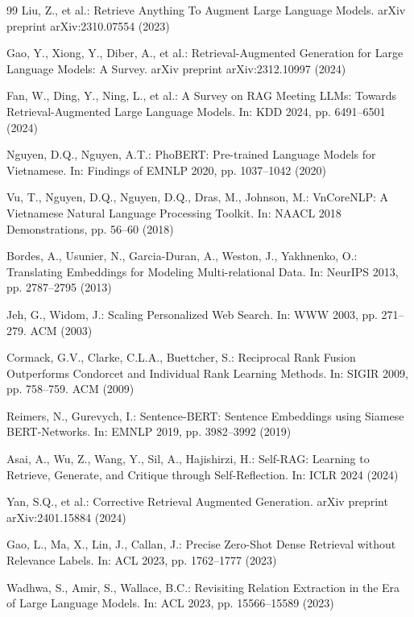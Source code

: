 \documentclass[11pt,a4paper]{article}
\begin{document}
\begin{thebibliography}{99}
Liu, Z., et al.: Retrieve Anything To Augment Large Language Models. arXiv preprint arXiv:2310.07554 (2023)

Gao, Y., Xiong, Y., Diber, A., et al.: Retrieval-Augmented Generation for Large Language Models: A Survey. arXiv preprint arXiv:2312.10997 (2024)

Fan, W., Ding, Y., Ning, L., et al.: A Survey on RAG Meeting LLMs: Towards Retrieval-Augmented Large Language Models. In: KDD 2024, pp. 6491--6501 (2024)

Nguyen, D.Q., Nguyen, A.T.: PhoBERT: Pre-trained Language Models for Vietnamese. In: Findings of EMNLP 2020, pp. 1037--1042 (2020)

Vu, T., Nguyen, D.Q., Nguyen, D.Q., Dras, M., Johnson, M.: VnCoreNLP: A Vietnamese Natural Language Processing Toolkit. In: NAACL 2018 Demonstrations, pp. 56--60 (2018)

Bordes, A., Usunier, N., Garcia-Duran, A., Weston, J., Yakhnenko, O.: Translating Embeddings for Modeling Multi-relational Data. In: NeurIPS 2013, pp. 2787--2795 (2013)

Jeh, G., Widom, J.: Scaling Personalized Web Search. In: WWW 2003, pp. 271--279. ACM (2003)

Cormack, G.V., Clarke, C.L.A., Buettcher, S.: Reciprocal Rank Fusion Outperforms Condorcet and Individual Rank Learning Methods. In: SIGIR 2009, pp. 758--759. ACM (2009)

Reimers, N., Gurevych, I.: Sentence-BERT: Sentence Embeddings using Siamese BERT-Networks. In: EMNLP 2019, pp. 3982--3992 (2019)

Asai, A., Wu, Z., Wang, Y., Sil, A., Hajishirzi, H.: Self-RAG: Learning to Retrieve, Generate, and Critique through Self-Reflection. In: ICLR 2024 (2024)

Yan, S.Q., et al.: Corrective Retrieval Augmented Generation. arXiv preprint arXiv:2401.15884 (2024)

Gao, L., Ma, X., Lin, J., Callan, J.: Precise Zero-Shot Dense Retrieval without Relevance Labels. In: ACL 2023, pp. 1762--1777 (2023)

Wadhwa, S., Amir, S., Wallace, B.C.: Revisiting Relation Extraction in the Era of Large Language Models. In: ACL 2023, pp. 15566--15589 (2023)


\end{thebibliography}
\end{document}
